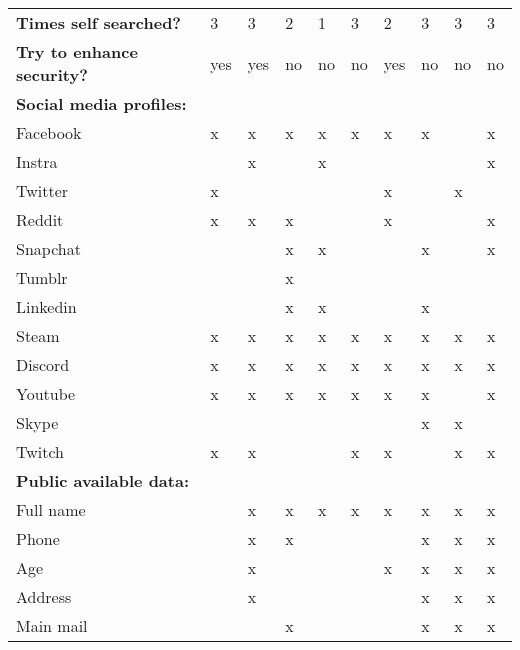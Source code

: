 \begin{table}
\begin{tabular}{llllllllll}
    \textbf{Times self searched?} & 3   & 3     & 2     & 1     & 3       & 2     & 3    & 3   & 3   \\
    \textbf{Try to enhance security?}         & yes & yes   & no    & no    & no      & yes   & no   & no  & no  \\
    \textbf{Social media profiles:} &  &  &  &  &  &  &  &  & \\
    Facebook        & x   & x     & x     & x     & x       & x     & x    &     & x   \\
    Instra          &     & x     &       & x     &         &       &      &     & x   \\
    Twitter         & x   &       &       &       &         & x     &      & x   &     \\
    Reddit          & x   & x     & x     &       &         & x     &      &     & x   \\
    Snapchat        &     &       & x     & x     &         &       & x    &     & x   \\
    Tumblr          &     &       & x     &       &         &       &      &     &     \\
    Linkedin        &     &       & x     & x     &         &       & x    &     &     \\
    Steam           & x   & x     & x     & x     & x       & x     & x    & x   & x   \\
    Discord         & x   & x     & x     & x     & x       & x     & x    & x   & x   \\
    Youtube         & x   & x     & x     & x     & x       & x     & x    &     & x   \\
    Skype           &     &       &       &       &         &       & x    & x   &     \\
    Twitch          & x   & x     &       &       & x       & x     &      & x   & x   \\
    \textbf{Public available data:} &  &  &  &  &  &  &  &  & \\
    Full name       &     & x     & x     & x     & x       & x     & x    & x   & x   \\
    Phone           &     & x     & x     &       &         &       & x    & x   & x   \\
    Age             &     & x     &       &       &         & x     & x    & x   & x   \\
    Address         &     & x     &       &       &         &       & x    & x   & x   \\
    Main mail       &     &       & x     &       &         &       & x    & x   & x   \\

\end{tabular}
\end{table}
